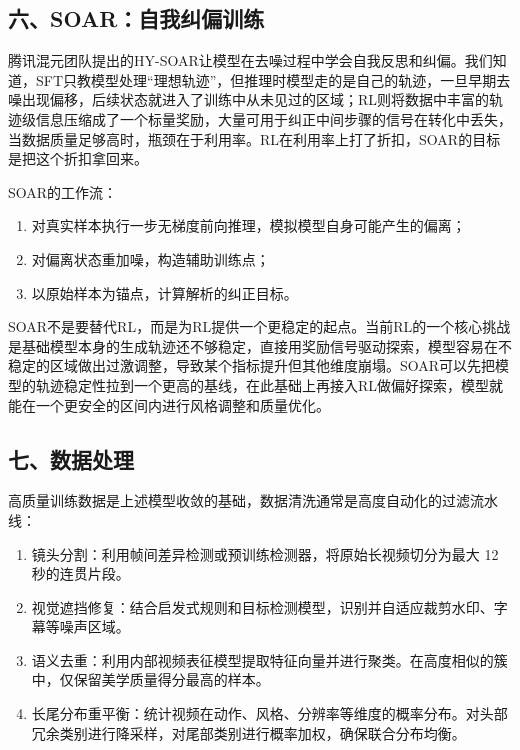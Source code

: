 \hypertarget{ux516dsoarux81eaux6211ux7ea0ux504fux8badux7ec3}{%
\subsection{六、SOAR：自我纠偏训练}\label{ux516dsoarux81eaux6211ux7ea0ux504fux8badux7ec3}}

腾讯混元团队提出的HY-SOAR让模型在去噪过程中学会自我反思和纠偏。我们知道，SFT只教模型处理``理想轨迹''，但推理时模型走的是自己的轨迹，一旦早期去噪出现偏移，后续状态就进入了训练中从未见过的区域；RL则将数据中丰富的轨迹级信息压缩成了一个标量奖励，大量可用于纠正中间步骤的信号在转化中丢失，当数据质量足够高时，瓶颈在于利用率。RL在利用率上打了折扣，SOAR的目标是把这个折扣拿回来。

SOAR的工作流：

\begin{enumerate}
\def\labelenumi{\arabic{enumi}.}
\item
  对真实样本执行一步无梯度前向推理，模拟模型自身可能产生的偏离；
\item
  对偏离状态重加噪，构造辅助训练点；
\item
  以原始样本为锚点，计算解析的纠正目标。
\end{enumerate}

SOAR不是要替代RL，而是为RL提供一个更稳定的起点。当前RL的一个核心挑战是基础模型本身的生成轨迹还不够稳定，直接用奖励信号驱动探索，模型容易在不稳定的区域做出过激调整，导致某个指标提升但其他维度崩塌。SOAR可以先把模型的轨迹稳定性拉到一个更高的基线，在此基础上再接入RL做偏好探索，模型就能在一个更安全的区间内进行风格调整和质量优化。

\hypertarget{ux4e03ux6570ux636eux5904ux7406}{%
\subsection{七、数据处理}\label{ux4e03ux6570ux636eux5904ux7406}}

高质量训练数据是上述模型收敛的基础，数据清洗通常是高度自动化的过滤流水线：

\begin{enumerate}
\def\labelenumi{\arabic{enumi}.}
\item
  镜头分割：利用帧间差异检测或预训练检测器，将原始长视频切分为最大 12 秒的连贯片段。
\item
  视觉遮挡修复：结合启发式规则和目标检测模型，识别并自适应裁剪水印、字幕等噪声区域。
\item
  语义去重：利用内部视频表征模型提取特征向量并进行聚类。在高度相似的簇中，仅保留美学质量得分最高的样本。
\item
  长尾分布重平衡：统计视频在动作、风格、分辨率等维度的概率分布。对头部冗余类别进行降采样，对尾部类别进行概率加权，确保联合分布均衡。
\end{enumerate}

